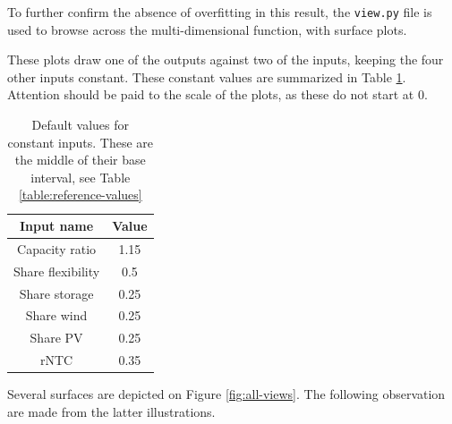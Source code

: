 To further confirm the absence of overfitting in this result, the \texttt{view.py} file is used to browse across the multi-dimensional function, with surface plots.

These plots draw one of the outputs against two of the inputs, keeping the four other inputs constant. These constant values are summarized in Table \ref{tab:default-view-values}. Attention should be paid to the scale of the plots, as these do not start at 0.

\begin{table}[h!]
    \centering
    \begin{tabular}{|c|c|}
        \hline
        Input name & Value \\ \hline
        Capacity ratio & 1.15 \\
        Share flexibility & 0.5 \\
        Share storage & 0.25 \\
        Share wind & 0.25 \\
        Share PV & 0.25 \\
        rNTC & 0.35 \\ \hline
    \end{tabular}
    \caption{Default values for constant inputs. These are the middle of their base interval, see Table \ref{table:reference-values}}
    \label{tab:default-view-values}
\end{table}

Several surfaces are depicted on Figure \ref{fig:all-views}. The following observation are made from the latter illustrations.

